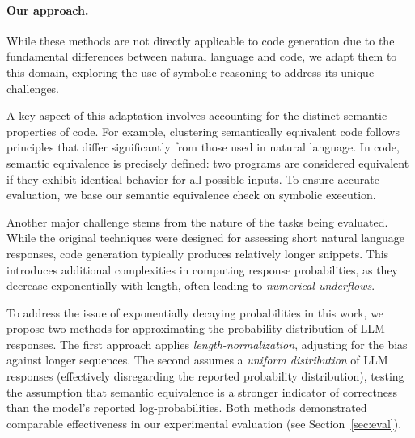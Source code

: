 




\paragraph{Our approach.} While these methods are not directly applicable to code generation due to the fundamental differences between natural language and code, we adapt them to this domain, exploring the use of symbolic reasoning to address its unique challenges.

A key aspect of this adaptation involves accounting for the distinct semantic properties of code. 
For example, clustering semantically equivalent code follows principles that differ significantly from those used in natural language. 
In code, semantic equivalence is precisely defined: two programs are considered equivalent if they exhibit identical behavior for all possible inputs. 
To ensure accurate evaluation, we base our semantic equivalence check on symbolic execution.

Another major challenge stems from the nature of the tasks being evaluated. 
While the original techniques were designed for assessing short natural language responses, code generation typically produces relatively longer snippets. 
This introduces additional complexities in computing response probabilities, as they decrease exponentially with length, often leading to \emph{numerical underflows}.

To address the issue of exponentially decaying probabilities in this work, we propose two methods for approximating the probability distribution of LLM responses. 
The first approach applies \emph{length-normalization}, adjusting for the bias against longer sequences. 
The second assumes a \emph{uniform distribution} of LLM responses (effectively disregarding the reported probability distribution), testing the assumption that semantic equivalence is a stronger indicator of correctness than the model's reported log-probabilities. 
Both methods demonstrated comparable effectiveness in our experimental evaluation (see Section~\ref{sec:eval}).

